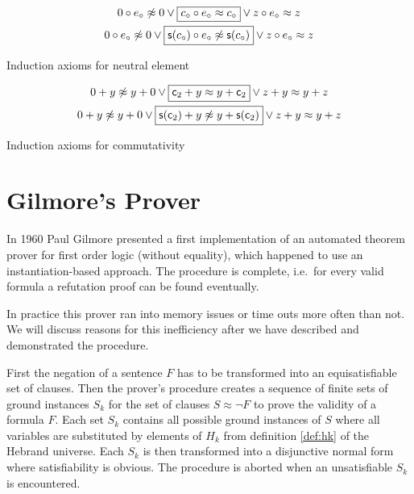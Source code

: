 \begin{table}[hbt]	
	\begin{gather*}
	0\circ e_\circ\not\approx 0
	\lor\boxed{
		c_\circ \circ e_\circ \approx c_\circ
	}
	\lor z\circ e_\circ \approx z
	\\
	0\circ e_\circ\not\approx 0
	\lor\boxed{
		{\mathsf s}(c_\circ) \circ e_\circ \not\approx {\mathsf s}(c_\circ)
	}
	\lor z\circ e_\circ \approx z
	\end{gather*}
	\caption{Induction axioms for neutral element}
	\label{tab:presburger:induction:clauses}
\end{table}

\begin{table}[hbt]	
	\begin{gather*}
	{0+y\not\approx y+0} 
	\lor\boxed{{\mathsf c}_2+y\approx y+{\mathsf c}_2} 
	\lor{z+y\approx y+z} 
	\\
	0+y\not\approx y+0 \lor 
	\boxed{{\mathsf s}({\mathsf c}_2)+y\not\approx y+{\mathsf s}({\mathsf c}_2)} 
	\lor z+y\approx y+z
	\end{gather*}
	\caption{Induction axioms for commutativity}
	\label{tab:presburger:induction:commutativity}
\end{table}

\section{Gilmore's Prover}\label{sec:gilmore:prover}

In 1960 Paul Gilmore presented a first {\myem implementation} of an automated 
theorem prover \cite{5392528} for first order logic (without equality),
which happened to use an instantiation-based approach. 
The procedure is complete, i.e.~for every valid formula 
a refutation proof can be found eventually.

In practice this prover ran into memory issues or time outs more often than not.
We will discuss reasons for this inefficiency after we have described and demonstrated the procedure.

First the negation of a sentence $F$ has to be transformed into an equisatisfiable set of clauses.
Then the prover's procedure 
creates a sequence of finite sets of ground instances $S_k$ 
for the set of clauses $S\approx\lnot F$ to prove the validity of a formula $F$.
Each set $S_k$ contains all possible ground instances of $S$ 
where all variables are substituted by elements of $H_k$
from definition \ref{def:hk} of the Hebrand universe.
Each $S_k$ is then transformed into a disjunctive normal form where satisfiability is obvious.
The procedure is aborted when an unsatisfiable $S_k$ is encountered.

